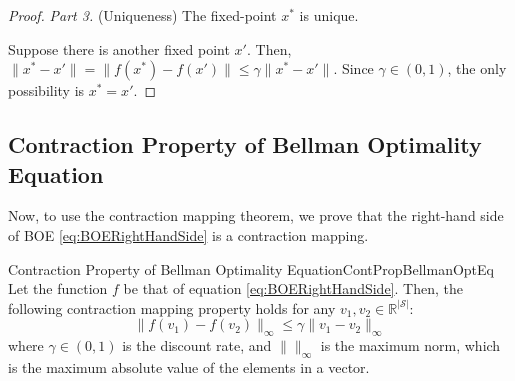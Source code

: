 \begin{proof}
            \textit{Part 3.} (Uniqueness) The fixed-point $x^*$ is unique.

            Suppose there is another fixed point $x'$. Then, $\|x^*-x'\| = \|f(x^*)-f(x')\| \leq \gamma \|x^*-x'\|$. Since $\gamma \in (0,1)$, the only possibility is $x^*=x'$.


        \end{proof}
    \subsection{Contraction Property of Bellman Optimality Equation}
        Now, to use the contraction mapping theorem, we prove that the right-hand side of BOE \ref{eq:BOERightHandSide} is a contraction mapping.
        \begin{thm}{Contraction Property of Bellman Optimality Equation}{ContPropBellmanOptEq}
            Let the function $f$ be that of equation \ref{eq:BOERightHandSide}. Then, the following contraction mapping property holds for any $v_1,v_2 \in \mathbb{R}^{|\mathcal S|}$:
            \begin{equation}
                \|f(v_1)-f(v_2)\|_{\infty} \leq \gamma \|v_1 - v_2\|_\infty
            \end{equation}
            where $\gamma \in (0,1)$ is the discount rate, and $\|\|_\infty$ is the maximum norm, which is the maximum absolute value of the elements in a vector.
        \end{thm}
